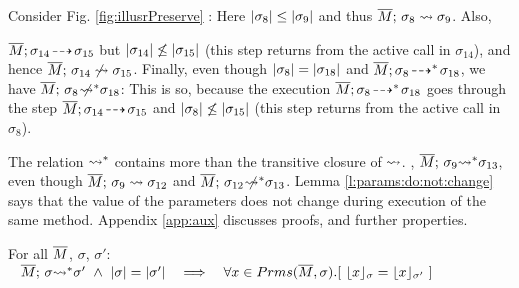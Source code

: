Consider    Fig. \ref{fig:illusrPreserve} :
Here $|\sigma_8| \leq |\sigma_9|$ and thus $\overline{M};\, {\sigma_8} \rightsquigarrow \sigma_9$. Also,  {$\overline{M};\sigma_{14}\! \dashrightarrow\! {\sigma_{15}}$  but  $|\sigma_{14}| \not\leq |\sigma_{15}| $  (this step returns from the active call in $\sigma_{14}$), and hence   $\overline{M};\, {\sigma_{14}} \not\rightsquigarrow \sigma_{15}$. 
Finally, even though $|\sigma_8| = |\sigma_{18}|$
 and $\overline{M};\sigma_8\! \dashrightarrow^*\! {\sigma_{18}}$, we have  
 $\overline{M};\, {\sigma_8} \not\!\!\!{\rightsquigarrow^*} \sigma_{18}$:
This is so, because the execution $\overline{M};\sigma_8\! \dashrightarrow^*\! {\sigma_{18}}$ goes through the step
$\overline{M};\sigma_{14}\! \dashrightarrow\! {\sigma_{15}}$ and  $|\sigma_{8}| \not\leq |\sigma_{15}| $
 (this step returns from the active call in  $\sigma_8$).

\vspace{.1cm}
{The relation ${\rightsquigarrow^*}$ contains more than the transitive closure of  $\rightsquigarrow$.
\Eg, ${\overline{M};\, {\sigma_9} {\rightsquigarrow^*} \sigma_{13}}$, even though ${\overline{M};\, {\sigma_{9}} \rightsquigarrow \sigma_{12}}$  and ${\overline{M};\, {\sigma_{12}} \not\!\!\!{\rightsquigarrow^*} \sigma_{13}}$.} 
%
Lemma \ref{l:params:do:not:change} says that the value of the parameters does not change during  execution of the same method. 
Appendix \ref{app:aux} discusses proofs, and further properties.%
 



\begin{lemma}
\label{l:params:do:not:change} 
 
For all $\overline{M}$, $\sigma$, $\sigma'$:
 $\strut \hspace{0.3cm} \leadstoBoundedStar {\Mtwo}  {\sigma}  {\sigma'} \ \wedge  \ \DepthFs{\sigma}=\DepthFs {\sigma'}\ \ \ \Longrightarrow\ \  \ \forall x\in \Formals {\Mtwo} {\sigma}.[ \ \interpret \sigma x = \interpret {\sigma'} x \ ]$


\end{lemma}}
